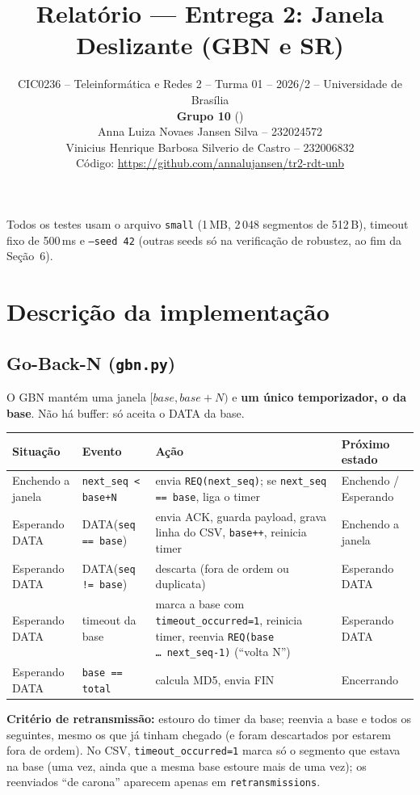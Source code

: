 \documentclass[11pt,a4paper]{article}
\title{\vspace{-1.2cm}Relatório --- Entrega 2: Janela Deslizante (GBN e SR)}
\author{%
  CIC0236 -- Teleinformática e Redes 2 -- Turma 01 -- 2026/2 -- Universidade de Brasília\\[0.4em]
  \textbf{Grupo 10} (\cod{--group grupo10})\\
  Anna Luiza Novaes Jansen Silva -- 232024572\\
  Vinicius Henrique Barbosa Silverio de Castro -- 232006832\\[0.4em]
  Código: \url{https://github.com/annalujansen/tr2-rdt-unb}}
\date{}
\newcommand{\cod}[1]{\textcolor{codverde}{\texttt{\small #1}}}
\begin{document}
\maketitle
\vspace{-0.5cm}

Todos os testes usam o arquivo \cod{small} (1\,MB, 2\,048 segmentos de 512\,B), timeout fixo de 500\,ms e \cod{--seed 42} (outras seeds só na verificação de robustez, ao fim da Seção~6).

\section{Descrição da implementação}

\subsection{Go-Back-N (\cod{gbn.py})}

O GBN mantém uma janela $[\mathit{base}, \mathit{base}+N)$ e \textbf{um único temporizador, o da base}. Não há buffer: só aceita o DATA da base.

\begin{center}\small
\begin{tabularx}{\textwidth}{@{}l l L l@{}}
\toprule
\textbf{Situação} & \textbf{Evento} & \textbf{Ação} & \textbf{Próximo estado}\\
\midrule
Enchendo a janela & \cod{next\_seq < base+N} & envia \cod{REQ(next\_seq)}; se \cod{next\_seq == base}, liga o timer & Enchendo / Esperando\\
Esperando DATA & DATA(\cod{seq == base}) & envia ACK, guarda payload, grava linha do CSV, \cod{base++}, reinicia timer & Enchendo a janela\\
Esperando DATA & DATA(\cod{seq != base}) & descarta (fora de ordem ou duplicata) & Esperando DATA\\
Esperando DATA & timeout da base & marca a base com \cod{timeout\_occurred=1}, reinicia timer, reenvia \cod{REQ(base \ldots\ next\_seq-1)} (``volta N'') & Esperando DATA\\
Esperando DATA & \cod{base == total} & calcula MD5, envia FIN & Encerrando\\
\bottomrule
\end{tabularx}
\end{center}

\textbf{Critério de retransmissão:} estouro do timer da base; reenvia a base e todos os seguintes, mesmo os que já tinham chegado (e foram descartados por estarem fora de ordem). No CSV, \cod{timeout\_occurred=1} marca só o segmento que estava na base (uma vez, ainda que a mesma base estoure mais de uma vez); os reenviados ``de carona'' aparecem apenas em \cod{retransmissions}.
\end{document}
